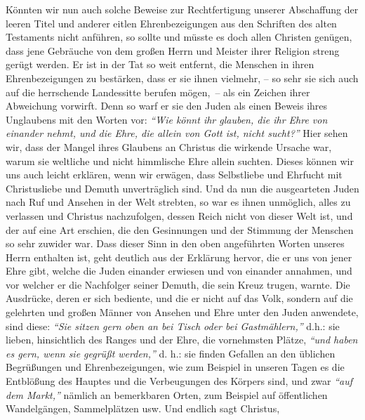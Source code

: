 Könnten wir nun auch solche Beweise zur Rechtfertigung unserer Abschaffung der
leeren Titel und anderer eitlen Ehrenbezeigungen aus den Schriften des alten
Testaments nicht anführen, so sollte und müsste es doch allen Christen genügen,
dass jene Gebräuche von dem großen Herrn und Meister ihrer Religion streng
gerügt
werden. Er ist in der Tat so weit entfernt, die Menschen in ihren
Ehrenbezeigungen zu bestärken, dass er sie ihnen vielmehr, -- so sehr sie sich
auch auf die herrschende Landessitte berufen mögen,~-- als ein Zeichen ihrer
Abweichung vorwirft. Denn so warf er sie den Juden als einen Beweis ihres
Unglaubens mit den Worten vor:
\textit{"`Wie könnt ihr glauben, die ihr Ehre von einander
nehmt, und die Ehre, die allein von Gott ist, nicht sucht?"'}
Hier sehen wir, dass der Mangel ihres Glaubens an Christus die wirkende
Ursache war, warum sie weltliche und nicht himmlische Ehre allein suchten.
Dieses können wir uns auch leicht erklären, wenn wir erwägen, dass Selbstliebe
und Ehrfucht mit Christusliebe und Demuth unverträglich sind. Und da nun die
ausgearteten Juden nach Ruf und Ansehen in der Welt strebten, so war es ihnen
unmöglich, alles zu verlassen und Christus nachzufolgen, dessen
Reich nicht von
dieser Welt ist, und der auf eine Art erschien, die den Gesinnungen und der
Stimmung der Menschen so sehr zuwider war. Dass dieser Sinn in den oben
angeführten Worten unseres Herrn enthalten ist, geht deutlich aus der Erklärung
hervor, die er uns von jener Ehre gibt, welche die Juden
einander erwiesen und
von einander annahmen, und vor welcher er die Nachfolger seiner Demuth, die sein
Kreuz trugen, warnte. Die Ausdrücke, deren er sich bediente,
und die er nicht
auf das Volk, sondern auf die gelehrten und großen Männer von Ansehen und Ehre
unter den Juden anwendete, sind diese:
\textit{"`Sie sitzen gern oben an bei Tisch
oder bei Gastmählern,"'}
d.h.: sie lieben, hinsichtlich des
Ranges und der Ehre, die vornehmsten Plätze,
\textit{"`und haben es gern, wenn sie gegrüßt werden,"'}
d. h.: sie
finden Gefallen an den üblichen Begrüßungen und Ehrenbezeigungen, wie zum
Beispiel in
unseren Tagen es die Entblößung des Hauptes und die Verbeugungen des Körpers
sind,
und zwar \textit{"`auf dem Markt,"'} nämlich an bemerkbaren Orten, zum Beispiel
auf
öffentlichen Wandelgängen, Sammelplätzen usw. Und endlich sagt Christus,
